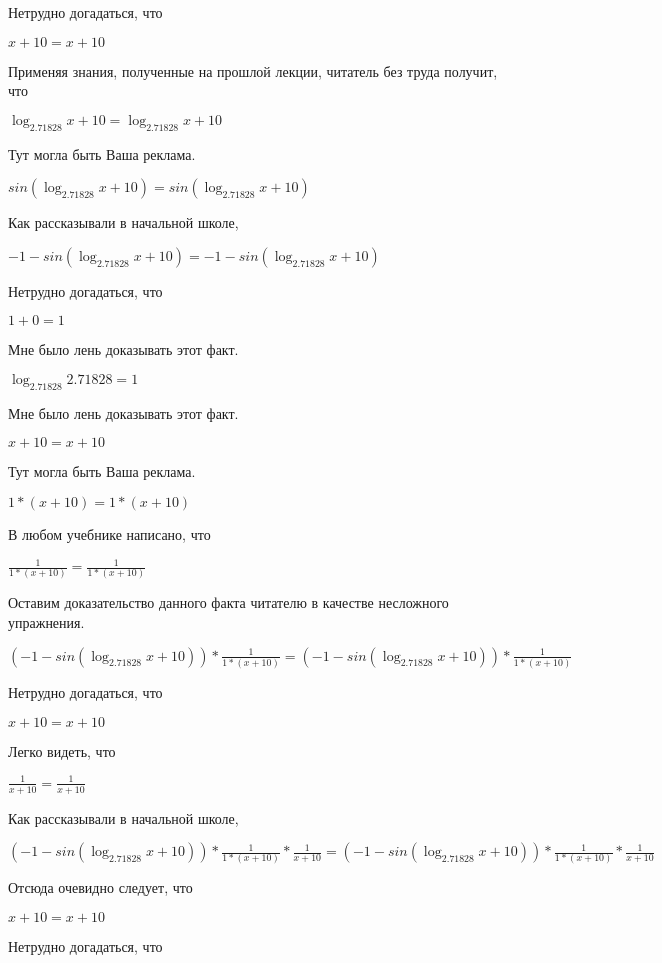 \documentclass[12pt,a4paper,fleqn]{article}
\theoremstyle{definition}
\begin{document}
Нетрудно догадаться, что 

$ x  +  10  =  x  +  10 $

Применяя знания, полученные на прошлой лекции, читатель без труда получит, что 

$\log_{ 2.71828 }{ x  +  10 } = \log_{ 2.71828 }{ x  +  10 }$

Тут могла быть Ваша реклама. 

$sin(\log_{ 2.71828 }{ x  +  10 }) = sin(\log_{ 2.71828 }{ x  +  10 })$

Как рассказывали в начальной школе, 

$ -1  - sin(\log_{ 2.71828 }{ x  +  10 }) =  -1  - sin(\log_{ 2.71828 }{ x  +  10 })$

Нетрудно догадаться, что 

$ 1  +  0  =  1 $

Мне было лень доказывать этот факт.

$\log_{ 2.71828 }{ 2.71828 } =  1 $

Мне было лень доказывать этот факт.

$ x  +  10  =  x  +  10 $

Тут могла быть Ваша реклама. 

$ 1  * ( x  +  10 ) =  1  * ( x  +  10 )$

В любом учебнике написано, что 

$\frac{ 1 }{ 1  * ( x  +  10 )}
 = \frac{ 1 }{ 1  * ( x  +  10 )}
$

Оставим доказательство данного факта читателю в качестве несложного упражнения. 

$( -1  - sin(\log_{ 2.71828 }{ x  +  10 })) * \frac{ 1 }{ 1  * ( x  +  10 )}
 = ( -1  - sin(\log_{ 2.71828 }{ x  +  10 })) * \frac{ 1 }{ 1  * ( x  +  10 )}
$

Нетрудно догадаться, что 

$ x  +  10  =  x  +  10 $

Легко видеть, что 

$\frac{ 1 }{ x  +  10 }
 = \frac{ 1 }{ x  +  10 }
$

Как рассказывали в начальной школе, 

$( -1  - sin(\log_{ 2.71828 }{ x  +  10 })) * \frac{ 1 }{ 1  * ( x  +  10 )}
 * \frac{ 1 }{ x  +  10 }
 = ( -1  - sin(\log_{ 2.71828 }{ x  +  10 })) * \frac{ 1 }{ 1  * ( x  +  10 )}
 * \frac{ 1 }{ x  +  10 }
$

Отсюда очевидно следует, что 

$ x  +  10  =  x  +  10 $

Нетрудно догадаться, что 
\end{document}
